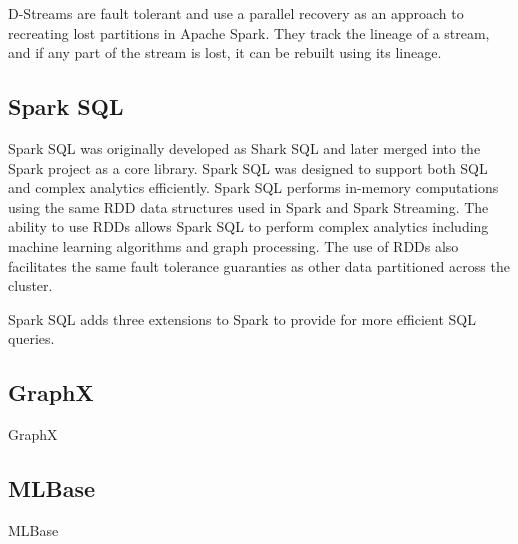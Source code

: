 D-Streams are fault tolerant and use a parallel recovery as an approach to recreating lost partitions in Apache Spark. They track the lineage of a stream, and if any part of the stream is lost, it can be rebuilt using its lineage.

\subsection{Spark SQL}
Spark SQL was originally developed as Shark SQL \cite{shark} and later merged into the Spark project as a core library. Spark SQL was designed to support both SQL and complex analytics efficiently. Spark SQL performs in-memory computations using the same RDD data structures used in Spark and Spark Streaming. The ability to use RDDs allows Spark SQL to perform complex analytics including machine learning algorithms and graph processing. The use of RDDs also facilitates the same fault tolerance guaranties as other data partitioned across the cluster. 

Spark SQL adds three extensions to Spark to provide for more efficient SQL queries. 

\subsection{GraphX}
GraphX \cite{xin2013graphx}

\subsection{MLBase}

MLBase \cite{kraska2013mlbase}
